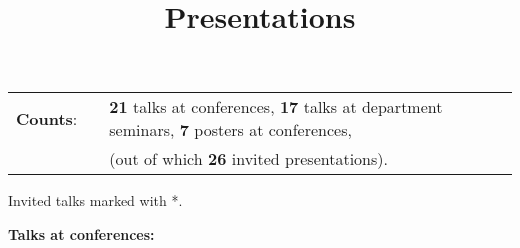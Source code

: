 \documentclass[11pt,letterpaper,sans]{moderncv}   %
\title{Presentations}
\begin{document}
\pagestyle{headonly}

\maketitle




\begin{tabular}{rcl}
\textbf{Counts}: &\hspace{0.3cm} &{\textbf{21} talks at conferences}, {\textbf{17} talks at department seminars}, {\textbf{7} posters at conferences,} \\
& &{(out of which \textbf{26} invited presentations).}
\end{tabular}

\vspace{0.5cm}
Invited talks marked with *.
\vspace{0.2cm}

\textcolor{color1}{\textbf{Talks at conferences:}}
\vspace{-0.5cm}
\end{document}
